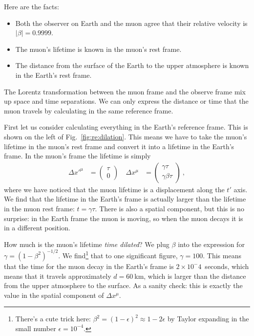 Here are the facts:
\begin{itemize}
    \item Both the observer on Earth and the muon agree that their relative velocity is $|\beta| = 0.9999$. 
    \item The muon's lifetime is known in the muon's rest frame. 
    \item The distance from the surface of the Earth to the upper atmosphere is known in the Earth's rest frame. 
\end{itemize}
The Lorentz transformation between the muon frame and the observe frame mix up space and time separations. We can only express the distance or time that the muon travels by calculating in the same reference frame. 


First let us consider calculating everything in the Earth's reference frame. This is shown on the left of Fig.~\ref{fig:re:dilation}. This means we have to take the muon's lifetime in the muon's rest frame and convert it into a lifetime in the Earth's frame. In the muon's frame the lifetime is simply 
\begin{align}
    \Delta x'^\mu &= 
    \begin{pmatrix}
    \tau \\ 0     
    \end{pmatrix} \ 
    &
    \Delta x^\mu &=
    \begin{pmatrix}
    \gamma \tau \\ \gamma\beta \tau    
    \end{pmatrix} \ ,
\end{align}
where we have noticed that the muon lifetime is a displacement along the $t'$ axis. We find that the lifetime in the Earth's frame is actually larger than the lifetime in the muon rest frame: $t = \gamma \tau$. There is also a spatial component, but this is no surprise: in the Earth frame the muon is moving, so when the muon decays it is in a different position. 

How much is the muon's lifetime \emph{time dilated}? We plug $\beta$ into the expression for $\gamma = (1-\beta^2)^{-1/2}$. We find\footnote{There's a cute trick here: $\beta^2 = (1-\epsilon)^2 \approx 1- 2\epsilon$ by Taylor expanding in the small number $\epsilon = 10^{-4}$.} that to one significant figure, $\gamma = 100$. This means that the time for the muon decay in the Earth's frame is $2\times 10^-4$~seconds, which means that it travels approximately $d=60~$km, which is larger than the distance from the upper atmosphere to the surface. As a sanity check: this is exactly the value in the spatial component of $\Delta x^\mu$.

